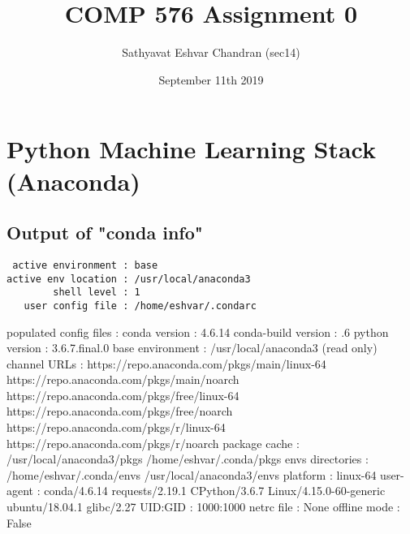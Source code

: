 \documentclass[11pt]{article}
\title{COMP 576 Assignment 0}
\author{Sathyavat Eshvar Chandran (sec14)}
\date{September 11th 2019}
\begin{document}
    
    
    \maketitle
    
    

    
    \section*{Python Machine Learning Stack
(Anaconda)}\label{python-machine-learning-stack-anaconda}

\subsection*{Output of "conda info"}\label{output-of-conda-info}

\begin{verbatim}
 active environment : base
active env location : /usr/local/anaconda3
        shell level : 1
   user config file : /home/eshvar/.condarc
\end{verbatim}

populated config files : conda version : 4.6.14 conda-build version : .6 python version : 3.6.7.final.0 base environment : \newline
/usr/local/anaconda3 (read only) channel URLs : \newline
https://repo.anaconda.com/pkgs/main/linux-64 \newline
https://repo.anaconda.com/pkgs/main/noarch \newline
https://repo.anaconda.com/pkgs/free/linux-64 \newline
https://repo.anaconda.com/pkgs/free/noarch \newline
https://repo.anaconda.com/pkgs/r/linux-64 \newline
https://repo.anaconda.com/pkgs/r/noarch package cache : \newline
/usr/local/anaconda3/pkgs /home/eshvar/.conda/pkgs envs directories : \newline
/home/eshvar/.conda/envs /usr/local/anaconda3/envs platform : linux-64 \newline
user-agent : conda/4.6.14 requests/2.19.1 CPython/3.6.7 \newline
Linux/4.15.0-60-generic ubuntu/18.04.1 glibc/2.27 UID:GID : 1000:1000 \newline
netrc file : None offline mode : False \newline
\end{document}
